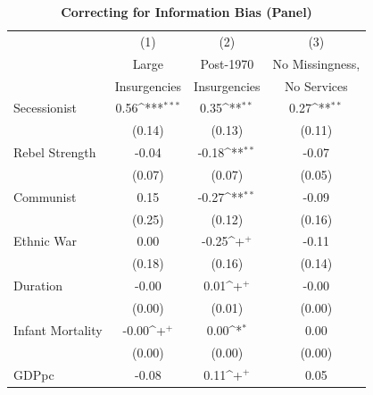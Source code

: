 \documentclass[12pt, letterpaper]{article}
\begin{document}
\newpage
\begin{table}[htbp]\centering
\begin{small}
\def\sym#1{\ifmmode^{#1}\else\(^{#1}\)\fi}
\renewcommand\thetable{A.\Roman{table}}
\makeatletter
\def\myrow{}
\CT@everycr{\noalign{%
\global\let\CT@row@color\relax
\stepcounter{mym20}%
\ifnum\value{mym20}=4
  \gdef\myrow{\rowcolor{gray!50}}
\else\ifnum\value{mym20}=6
  \gdef\myrow{}
\fi\fi
}\myrow}
\caption{\textbf{Correcting for Information Bias (Panel)}}
\label{table:infop}
\begin{tabular}{l*{3}{c}}
\hline\hline
                    &\multicolumn{1}{c}{(1)}&\multicolumn{1}{c}{(2)}&\multicolumn{1}{c}{(3)}\\
                    &\multicolumn{1}{c}{Large}&\multicolumn{1}{c}{Post-1970}&\multicolumn{1}{c}{No Missingness,}\\
  &\multicolumn{1}{c}{Insurgencies}&\multicolumn{1}{c}{Insurgencies}&\multicolumn{1}{c}{No Services}\\
\hline
Secessionist      &        0.56\sym{***}&        0.35\sym{**} &        0.27\sym{**} \\
                    &      (0.14)         &      (0.13)         &      (0.11)         \\
Rebel Strength      &       -0.04         &       -0.18\sym{**} &       -0.07         \\
                    &      (0.07)         &      (0.07)         &      (0.05)         \\
Communist           &        0.15         &       -0.27\sym{**} &       -0.09         \\
                    &      (0.25)         &      (0.12)         &      (0.16)         \\
Ethnic War          &        0.00         &       -0.25\sym{+}  &       -0.11         \\
                    &      (0.18)         &      (0.16)         &      (0.14)         \\
Duration            &       -0.00         &        0.01\sym{+}  &       -0.00         \\
                    &      (0.00)         &      (0.01)         &      (0.00)         \\
Infant Mortality    &       -0.00\sym{+}  &        0.00\sym{*}  &        0.00         \\
                    &      (0.00)         &      (0.00)         &      (0.00)         \\
GDPpc               &       -0.08         &        0.11\sym{+}  &        0.05         \\

\end{tabular}
\end{small}
\end{table}
\end{document}
